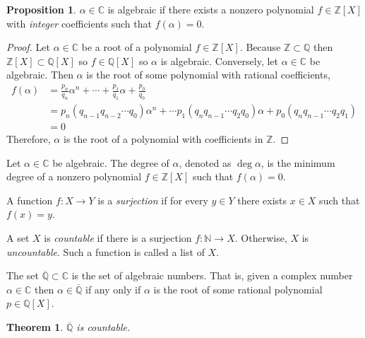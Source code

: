 \documentclass{article}
\newcommand{\Z}{\mathbb{Z}}
\newcommand{\N}{\mathbb{N}}
\newcommand{\C}{\mathbb{C}}
\newcommand{\Q}{\mathbb{Q}}
\newenvironment{definition}[1][Definition:]{\begin{trivlist}
\item[\hskip \labelsep {\bfseries #1}]}{\end{trivlist}}
\theoremstyle{theorem}
\newtheorem{theorem}{Theorem}[section]
\theoremstyle{definition}
\theoremstyle{definition}
\newtheorem*{proposition}{Proposition}
\theoremstyle{remark}
\theoremstyle{definition}
\theoremstyle{remark}
\begin{document}
\begin{proposition}
$\alpha \in \C$ is algebraic if there exists a nonzero polynomial $f \in \Z[X]$ with \textit{integer} coefficients such that $f(\alpha) = 0$. 
\end{proposition}

\begin{proof}
Let $\alpha \in \C$ be a root of a polynomial $f \in \Z[X]$. Because $\Z \subset \Q$ then $\Z[X] \subset \Q[X]$ so $f \in \Q[X]$ so $\alpha$ is algebraic. Conversely, let $\alpha \in \C$ be algebraic. Then $\alpha$ is the root of some polynomial with rational coefficients, 
\begin{align*}
f(\alpha) &= \frac{p_n}{q_n} \alpha^n + \cdots + \frac{p_1}{q_1} \alpha + \frac{p_0}{q_0} \\ & = p_n (q_{n-1} q_{n-2} \cdots q_0) \alpha^n + \cdots p_1 (q_n q_{n-1} \cdots q_{2} q_0) \alpha + p_0 (q_{n} q_{n-1} \cdots q_2 q_1) \\ & = 0 
\end{align*}
Therefore, $\alpha$ is the root of a polynomial with coefficients in $\Z$. 
\end{proof}

\begin{definition}
Let $\alpha \in \C$ be algebraic. The degree of $\alpha$, denoted as $\deg{\alpha}$, is the minimum degree of a nonzero polynomial $f \in \Z[X]$ such that $f(\alpha) = 0$.  
\end{definition}

\begin{definition}
A function $f : X \to Y$ is a \textit{surjection} if for every $y \in Y$ there exists $x \in X$ such that $f(x) = y$. 
\end{definition}

\begin{definition}
A set $X$ is \textit{countable} if there is a surjection $f : \N \to X$. Otherwise, $X$ is \textit{uncountable}. Such a function is called a list of $X$. 
\end{definition}

\begin{definition}
The set $\overline{\Q} \subset \C$ is the set of algebraic numbers. That is, given a complex number $\alpha \in \C$ then $\alpha \in \overline{\Q}$ if any only if $\alpha$ is the root of some rational polynomial $p \in \Q[X]$. 
\end{definition}

\begin{theorem}
$\overline{\Q}$ is countable.
\end{theorem}
\end{document}

